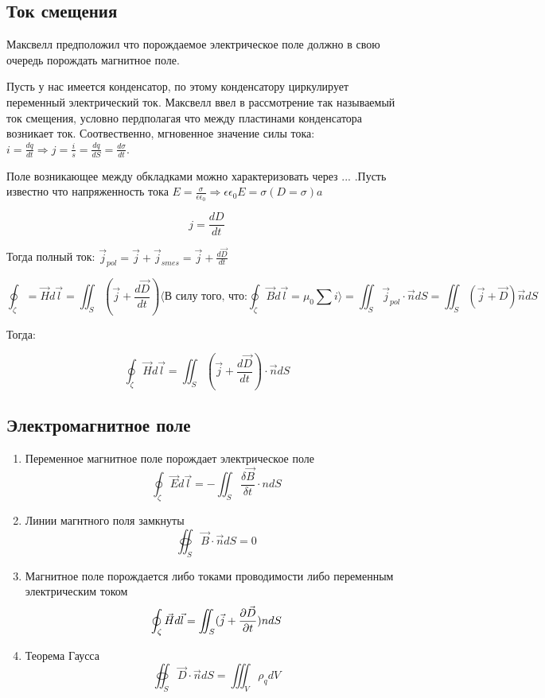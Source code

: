 \documentclass[../main.tex]{subfiles}
\begin{document}
\subsection{Ток смещения}
Максвелл предположил что порождаемое электрическое поле должно в свою очередь порождать магнитное поле.

Пусть у нас имеется конденсатор, по этому конденсатору циркулирует переменный электрический ток. Максвелл ввел в рассмотрение так называемый ток смещения, условно пердполагая
что между пластинами конденсатора возникает ток. Соотвественно, мгновенное значение силы тока: $i = \frac{dq}{dt} \Rightarrow j = \frac{i}{s} = \frac{dq}{dS} = \frac{d \sigma}{dt}$.

Поле возникающее между обкладками можно характеризовать через ... .Пусть известно что напряженность тока $E = \frac{\sigma}{\epsilon \epsilon_0} \Rightarrow \epsilon \epsilon_0 E = \sigma (D = \sigma)a$

\[j = \frac{d D}{dt}\]

Тогда полный ток: $\vec j_{pol} = \vec j + \vec j_{smes} = \vec j + \frac{d \vec D}{dt}$

\[ \oint_{\zeta} = \vec H d \vec l = \iint_S (\vec j + \frac{d \vec D}{dt}) \langle \text{В силу того, что:} \oint_{\zeta} \vec B d \vec l = \mu_0 \sum i \rangle = \iint_S \vec j_{pol} \cdot \vec n dS =
\iint_S (\vec j + \vec D) \vec n dS \]

Тогда:

\[ \oint_{\zeta} \vec H d \vec l = \iint_S (\vec j + \frac{d \vec D}{dt}) \cdot \vec n dS \]

\subsection{Электромагнитное поле}
\begin{enumerate}
    \item Переменное магнитное поле порождает электрическое поле
     \[ \oint_{\zeta} \vec E d \vec l = - \iint_S \frac{\delta \vec B}{\delta t} \cdot n dS\]
    \item Линии магнтного поля замкнуты 
    \[ \oiint_S \vec B \cdot \vec n dS = 0 \]
    \item Магнитное поле порождается либо токами проводимости либо переменным электрическим током
    \[ \oint_{\zeta} \vec H d \vec l = \iint_S (\vec j + \frac{\partial \vec D}{\partial t}) n dS\]
    \item Теорема Гаусса
    \[ \oiint_S \vec D \cdot \vec n dS = \iiint_V \rho_q dV\]
\end{enumerate}
\end{document}
